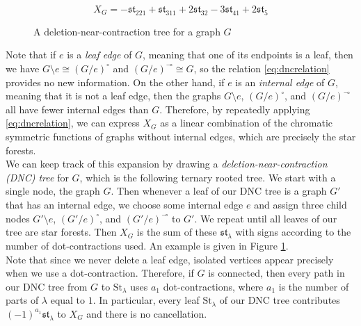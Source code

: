 \documentclass[12pt]{amsart}  %
\theoremstyle{definition}
\theoremstyle{remark}
\numberwithin{equation}{section}
\begin{document}
\begin{figure}

\begin{equation*}
X_G=-\mathfrak{st}_{221}+\mathfrak{st}_{311}+2\mathfrak{st}_{32}-3\mathfrak{st}_{41}+2\mathfrak{st}_5
\end{equation*}
\caption{\label{fig:dnctree} A deletion-near-contraction tree for a graph $G$}
\end{figure} 

Note that if $e$ is a \emph{leaf edge} of $G$, meaning that one of its endpoints is a leaf, then we have $G\setminus e\cong(G/e)^\circ$ and $(G/e)^\multimap\cong G$, so the relation \eqref{eq:dncrelation} provides no new information. On the other hand, if $e$ is an \emph{internal edge} of $G$, meaning that it is not a leaf edge, then the graphs $G\setminus e$, $(G/e)^\circ$, and $(G/e)^\multimap$ all have fewer internal edges than $G$. Therefore, by repeatedly applying \eqref{eq:dncrelation}, we can express $X_G$ as a linear combination of the chromatic symmetric functions of graphs without internal edges, which are precisely the star forests. \\

We can keep track of this expansion by drawing a \emph{deletion-near-contraction (DNC) tree} for $G$, which is the following ternary rooted tree. We start with a single node, the graph $G$. Then whenever a leaf of our DNC tree is a graph $G'$ that has an internal edge, we choose some internal edge $e$ and assign three child nodes $G'\setminus e$, $(G'/e)^\circ$, and $(G'/e)^\multimap$ to $G'$. We repeat until all leaves of our tree are star forests. Then $X_G$ is the sum of these $\mathfrak{st}_\lambda$ with signs according to the number of dot-contractions used. An example is given in Figure \ref{fig:dnctree}.\\

Note that since we never delete a leaf edge, isolated vertices appear precisely when we use a dot-contraction. Therefore, if $G$ is connected, then every path in our DNC tree from $G$ to $\text{St}_\lambda$ uses $a_1$ dot-contractions, where $a_1$ is the number of parts of $\lambda$ equal to $1$. In particular, every leaf $\text{St}_\lambda$ of our DNC tree contributes $(-1)^{a_1}\mathfrak{st}_\lambda$ to $X_G$ and there is no cancellation.\\
\end{document}
